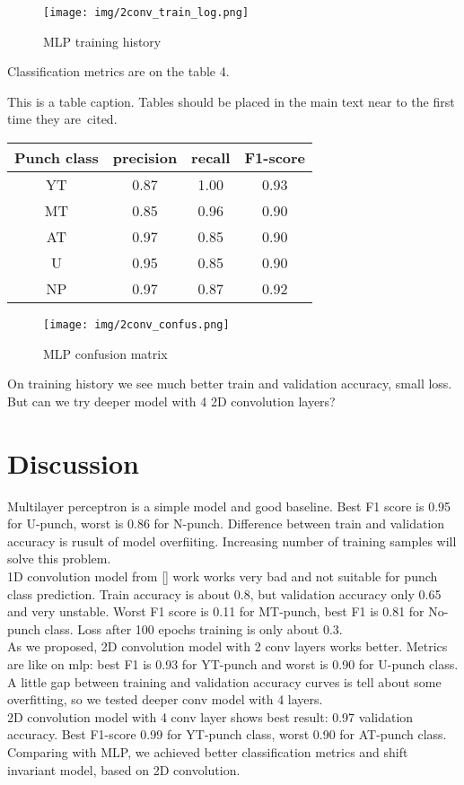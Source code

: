 \documentclass[sport,article,submit,moreauthors,pdftex]{Definitions/mdpi}
\begin{document}
\begin{figure}[H]
\texttt{[image: img/2conv\_train\_log.png]}
\caption{MLP training history}
\end{figure} 

Classification metrics are on the table 4.
\begin{specialtable}[H] 
\caption{This is a table caption. Tables should be placed in the main text near to the first time they are~cited.\label{tab4}}
\begin{tabular}{cccc}
\toprule
\textbf{Punch class}	& \textbf{precision}	& \textbf{recall}	& \textbf{F1-score}\\
\midrule
YT		& 0.87		& 1.00		& 0.93 \\
MT		& 0.85		& 0.96		& 0.90 \\
AT		& 0.97		& 0.85		& 0.90 \\
U		& 0.95		& 0.85		& 0.90 \\
NP		& 0.97		& 0.87		& 0.92 \\
\bottomrule
\end{tabular}
\end{specialtable}

\begin{figure}[H]
\texttt{[image: img/2conv\_confus.png]}
\caption{MLP confusion matrix}
\end{figure} 


On training history we see much better train and validation accuracy, small loss.
But can we try deeper model with 4 2D convolution layers?

\section{Discussion}
Multilayer perceptron is a simple model and good baseline. Best F1 score is 0.95 for U-punch, worst is 0.86 for N-punch. Difference between train and validation accuracy is rusult of model overfiiting.
Increasing number of training samples will solve this problem.\\
1D convolution model from [] work works very bad and not suitable for punch class prediction. Train accuracy is about 0.8, but validation accuracy only 0.65 and very unstable. Worst F1 score is 0.11 for MT-punch, best F1 is 0.81 for No-punch class. Loss after 100 epochs training is only about 0.3.\\
As we proposed, 2D convolution model with 2 conv layers works better. Metrics are like on mlp: best F1 is 0.93 for YT-punch and worst is 0.90 for U-punch class. A little gap between training and validation accuracy curves is tell about some overfitting, so we tested deeper conv model with 4 layers.\\
2D convolution model with 4 conv layer shows best result: 0.97 validation accuracy. Best F1-score 0.99 for YT-punch class, worst 0.90 for AT-punch class.\\
Comparing with MLP, we achieved better classification metrics and shift invariant model, based on 2D convolution. 
\end{document}
